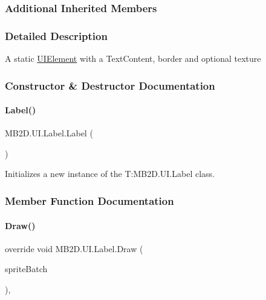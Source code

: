 \subsubsection*{Additional Inherited Members}


\subsubsection{Detailed Description}
A static \hyperlink{class_m_b2_d_1_1_u_i_1_1_u_i_element}{U\+I\+Element} with a Text\+Content, border and optional texture 



\subsubsection{Constructor \& Destructor Documentation}
\hypertarget{class_m_b2_d_1_1_u_i_1_1_label_af2e14465a2e06ca65487481d543de78c}{}\label{class_m_b2_d_1_1_u_i_1_1_label_af2e14465a2e06ca65487481d543de78c} 
\paragraph{\texorpdfstring{Label()}{Label()}}
{\footnotesize\ttfamily M\+B2\+D.\+U\+I.\+Label.\+Label (\begin{DoxyParamCaption}{ }\end{DoxyParamCaption})\hspace{0.3cm}{\ttfamily [inline]}}



Initializes a new instance of the T\+:\+M\+B2\+D.\+U\+I.\+Label class. 



\subsubsection{Member Function Documentation}
\hypertarget{class_m_b2_d_1_1_u_i_1_1_label_a976ec212cedf0710fb35cd578e1e51b1}{}\label{class_m_b2_d_1_1_u_i_1_1_label_a976ec212cedf0710fb35cd578e1e51b1} 
\paragraph{\texorpdfstring{Draw()}{Draw()}}
{\footnotesize\ttfamily override void M\+B2\+D.\+U\+I.\+Label.\+Draw (\begin{DoxyParamCaption}\item[{Sprite\+Batch}]{sprite\+Batch }\end{DoxyParamCaption})\hspace{0.3cm}{\ttfamily [inline]}, {\ttfamily [virtual]}}



